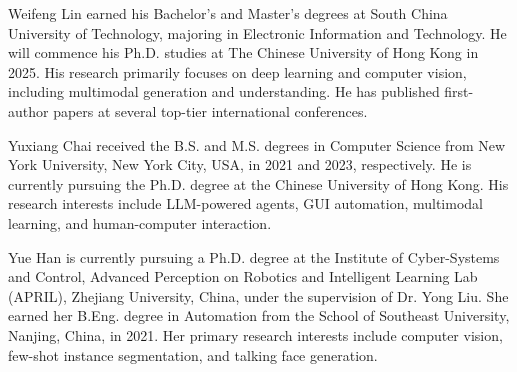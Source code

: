 \vspace{-3em}

\begin{IEEEbiography}{Weifeng Lin}
earned his Bachelor's and Master's degrees at South China University of Technology, majoring in Electronic Information and Technology. He will commence his Ph.D. studies at The Chinese University of Hong Kong in 2025. His research primarily focuses on deep learning and computer vision, including multimodal generation and understanding. He has published first-author papers at several top-tier international conferences.
\end{IEEEbiography}

\vspace{-3em}

\begin{IEEEbiography}{Yuxiang Chai}
received the B.S. and M.S. degrees in Computer Science from New York University, New York City, USA, in 2021 and 2023, respectively. He is currently pursuing the Ph.D. degree at the Chinese University of Hong Kong. His research interests include LLM-powered agents, GUI automation, multimodal learning, and human-computer interaction.
\end{IEEEbiography}

\vspace{-3em}

\begin{IEEEbiography}{Yue Han}
is currently pursuing a Ph.D. degree at the Institute of Cyber-Systems and Control, Advanced Perception on Robotics and Intelligent Learning Lab (APRIL), Zhejiang University, China, under the supervision of Dr. Yong Liu. She earned her B.Eng. degree in Automation from the School of Southeast University, Nanjing, China, in 2021. Her primary research interests include computer vision, few-shot instance segmentation, and talking face generation.
\end{IEEEbiography}

